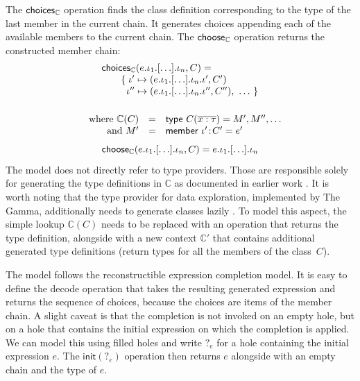 \documentclass[anonymous, a4paper,UKenglish,cleveref, autoref, thm-restate]{lipics-v2021}
\newcommand{\ident}[1]{\textsf{#1}}
\newcommand{\select}{\textnormal{\ident{choose}}}
\newcommand{\choices}{\textnormal{\ident{choices}}}
\begin{document}
The $\choices_\mathbb{C}$ operation finds the class definition corresponding to the type of the
last member in the current chain. It generates choices appending each of the available
members to the current chain. The $\select_\mathbb{C}$ operation returns the constructed
member chain:
\[
\begin{array}{l}
\choices_\mathbb{C}(e . \iota_1 . \lbrack\ldots\rbrack . \iota_n, C) =\\
\qquad \{\; \iota' \mapsto (e . \iota_1 . \lbrack\ldots\rbrack . \iota_n . \iota', C')\\
\qquad \;\; \iota'' \mapsto (e . \iota_1 . \lbrack\ldots\rbrack . \iota_n . \iota'', C''), ~\ldots~\}\\[1em]
\end{array}
\]\vspace{-2em}
\[
\begin{array}{rcl}
\quad \textnormal{where}~\mathbb{C}(C) &=& \ident{type}~C(\overline{x:\tau}) = M', M'', \ldots\\
\quad \textnormal{and}~M' &=& \ident{member}~\iota'\!:\!C'=e'
\end{array}
\]\vspace{-0.5em}
\[
\select_\mathbb{C}(e . \iota_1 . \lbrack\ldots\rbrack . \iota_n, C) = e . \iota_1 . \lbrack\ldots\rbrack . \iota_n
\]
The model does not directly refer to type providers. Those are responsible solely for generating
the type definitions in $\mathbb{C}$ as documented in earlier work \cite{petricek-2016-fsdata}.
It is worth noting that the type provider for data exploration, implemented by The Gamma,
additionally needs to generate classes lazily \cite{petricek-2017-dotdriven}. To model this aspect,
the simple lookup $\mathbb{C}(C)$ needs to be replaced with an operation that returns the type
definition, alongside with a new context $\mathbb{C}'$ that contains additional generated
type definitions (return types for all the members of the class~$C$).

The model follows the reconstructible expression completion model. It is easy to
define the \ident{decode} operation that takes the resulting generated expression and returns the
sequence of choices, because the choices are items of the member chain. A slight caveat is that
the completion is not invoked on an empty hole, but on a hole that contains the initial expression
on which the completion is applied. We can model this using filled holes \cite{omar-2019-holes}
and write $?_e$ for a hole containing the initial expression $e$. The $\ident{init}(?_e)$ operation
then returns $e$ alongside with an empty chain and the type of $e$.
\end{document}
